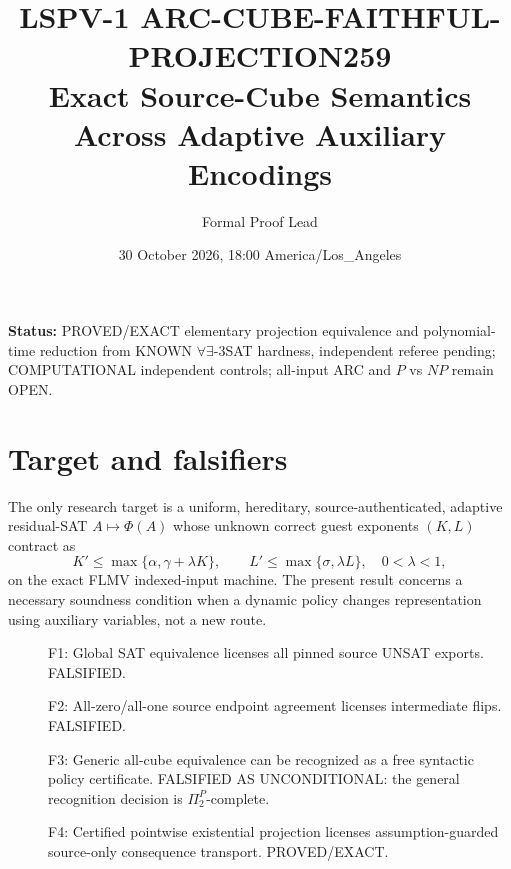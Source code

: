 \documentclass[11pt]{article}
\title{LSPV-1 ARC-CUBE-FAITHFUL-PROJECTION259\\Exact Source-Cube Semantics Across Adaptive Auxiliary Encodings}
\author{Formal Proof Lead}
\date{30 October 2026, 18:00 America/Los\_Angeles}
\begin{document}
\maketitle
\noindent\textbf{Status:} PROVED/EXACT elementary projection equivalence and polynomial-time reduction from KNOWN $\forall\exists$-3SAT hardness, independent referee pending; COMPUTATIONAL independent controls; all-input ARC and $P$ vs $NP$ remain OPEN.
\section{Target and falsifiers}
The only research target is a uniform, hereditary, source-authenticated, adaptive residual-SAT $A\mapsto\Phi(A)$ whose unknown correct guest exponents $(K,L)$ contract as
\[
 K'\le\max\{\alpha,\gamma+\lambda K\},\qquad
 L'\le\max\{\sigma,\lambda L\},\quad 0<\lambda<1,
\]
on the exact FLMV indexed-input machine. The present result concerns a necessary soundness condition when a dynamic policy changes representation using auxiliary variables, not a new route.
\begin{description}
\item[] F1: Global SAT equivalence licenses all pinned source UNSAT exports. FALSIFIED.
\item[] F2: All-zero/all-one source endpoint agreement licenses intermediate flips. FALSIFIED.
\item[] F3: Generic all-cube equivalence can be recognized as a free syntactic policy certificate. FALSIFIED AS UNCONDITIONAL: the general recognition decision is $\Pi_2^P$-complete.
\item[] F4: Certified pointwise existential projection licenses assumption-guarded source-only consequence transport. PROVED/EXACT.
\end{description}
\end{document}
